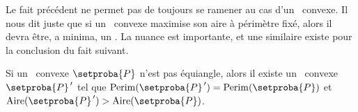 \begin{remark}
	Le fait précédent ne permet pas de toujours se ramener au cas d'un \nequi\ convexe. Il nous dit juste que si un \ngone\ convexe maximise son aire à périmètre fixé, alors il devra être, a minima, un \nequi. La nuance est importante, et une similaire existe pour la conclusion du fait suivant.
\end{remark}




\begin{fact} \label{must-be-iso}
	Si un \nequi\ convexe $\setproba{P}$ n'est pas équiangle,
	alors il existe un \ngone\ convexe $\primeit{\setproba{P}}$ tel que
	$\perim{\primeit{\setproba{P}}} = \perim{\setproba{P}}$
	et
	$\area{\primeit{\setproba{P}}} > \area{\setproba{P}}$.
\end{fact}


